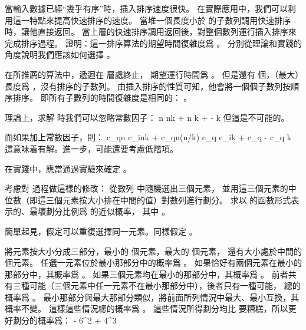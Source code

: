 \startEXERCISE
當輸入數據已經“幾乎有序”時，插入排序速度很快。
在實際應用中，我們可以利用這一特點來提高快速排序的速度。
當堆一個長度小於  的子數列調用快速排序時，讓他直接返回。
當上層的快速排序調用返回後，對整個數列運行插入排序來完成排序過程。
證明：這一排序算法的期望時間復雜度爲 。
分別從理論和實踐的角度說明我們應該如何選擇 。
\stopEXERCISE

\startANSWER
在所推薦的算法中，遞迴在  層處終止，
期望運行時間爲 。
但是還有  個，（最大）長度爲 ，沒有排序的子數列。
由插入排序的性質可知，他會將一個個子數列按順序排序。
即所有子數列的時間復雜度是相同的： 。

理論上，求解  時我們可以忽略常數因子：
\startformula\startmathalignment[n=1]
\NC n \ge nk + n \NR
\NC \Downarrow \NR
\NC {} \ge k +  -  \NR
\NC \Downarrow \NR
\NC {} \ge k \NR
\stopmathalignment\stopformula
但這是不可能的。

而如果加上常數因子，則：
\startformula\startmathalignment[n=1]
\NC c_qn \ge c_ink + c_qn\lg(n/k) \NR
\NC \Downarrow \NR
\NC c_q \ge c_ik + c_q - c_q \NR
\NC \Downarrow \NR
\NC {} \ge {}k \NR
\stopmathalignment\stopformula
這意味着有解。進一步，可能還要考慮低階項。

在實踐中，應當通過實驗來確定 。
\stopANSWER

考慮對  過程做這樣的修改：
從數列  中隨機選出三個元素，
並用這三個元素的中位數（即這三個元素按大小排在中間的值）對數列進行劃分。
求以 \m{\alpha} 的函數形式表示的、最壞劃分比例爲  的近似概率，
其中 。
\stopEXERCISE

\startANSWER
簡單起見，假定可以重復選擇同一元素。同樣假定 。

將元素按大小分成三部分，最小的  個元素，最大的  個元素，
還有大小處於中間的  個元素。
任選一元素位於最小那部分中的概率爲 。
如果恰好有兩個元素在最小的那部分中，其概率爲 。
如果三個元素均在最小的那部分中，其概率爲 。
前者共有三種可能（三個元素中任一元素不在最小那部分中），後者只有一種可能，
總的概率爲 。
最小那部分與最大那部分類似，將前面所列情況中最大、最小互換，其概率不變。
這樣這些情況總的概率爲 。
這些情況所得劃分均比  要糟糕，所以更好劃分的概率爲：
 - 6\alpha^2 + 4\alpha^3
\stopformula
\stopANSWER
